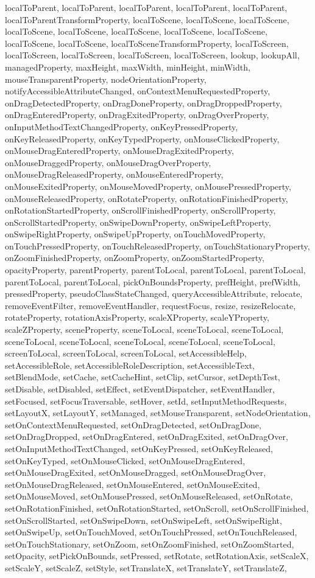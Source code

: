 {{{{{{{{{{{{{{{{{{{{{{{{{{{{{{{{{{{{{{{{{{{{{{{{{{{{{{{{{{{{{localToParent, localToParent, localToParent, localToParent, localToParent, localToParentTransformProperty, localToScene, localToScene, localToScene, localToScene, localToScene, localToScene, localToScene, localToScene, localToScene, localToScene, localToSceneTransformProperty, localToScreen, localToScreen, localToScreen, localToScreen, localToScreen, lookup, lookupAll, managedProperty, maxHeight, maxWidth, minHeight, minWidth, mouseTransparentProperty, nodeOrientationProperty, notifyAccessibleAttributeChanged, onContextMenuRequestedProperty, onDragDetectedProperty, onDragDoneProperty, onDragDroppedProperty, onDragEnteredProperty, onDragExitedProperty, onDragOverProperty, onInputMethodTextChangedProperty, onKeyPressedProperty, onKeyReleasedProperty, onKeyTypedProperty, onMouseClickedProperty, onMouseDragEnteredProperty, onMouseDragExitedProperty, onMouseDraggedProperty, onMouseDragOverProperty, onMouseDragReleasedProperty, onMouseEnteredProperty, onMouseExitedProperty, onMouseMovedProperty, onMousePressedProperty, onMouseReleasedProperty, onRotateProperty, onRotationFinishedProperty, onRotationStartedProperty, onScrollFinishedProperty, onScrollProperty, onScrollStartedProperty, onSwipeDownProperty, onSwipeLeftProperty, onSwipeRightProperty, onSwipeUpProperty, onTouchMovedProperty, onTouchPressedProperty, onTouchReleasedProperty, onTouchStationaryProperty, onZoomFinishedProperty, onZoomProperty, onZoomStartedProperty, opacityProperty, parentProperty, parentToLocal, parentToLocal, parentToLocal, parentToLocal, parentToLocal, pickOnBoundsProperty, prefHeight, prefWidth, pressedProperty, pseudoClassStateChanged, queryAccessibleAttribute, relocate, removeEventFilter, removeEventHandler, requestFocus, resize, resizeRelocate, rotateProperty, rotationAxisProperty, scaleXProperty, scaleYProperty, scaleZProperty, sceneProperty, sceneToLocal, sceneToLocal, sceneToLocal, sceneToLocal, sceneToLocal, sceneToLocal, sceneToLocal, sceneToLocal, screenToLocal, screenToLocal, screenToLocal, setAccessibleHelp, setAccessibleRole, setAccessibleRoleDescription, setAccessibleText, setBlendMode, setCache, setCacheHint, setClip, setCursor, setDepthTest, setDisable, setDisabled, setEffect, setEventDispatcher, setEventHandler, setFocused, setFocusTraversable, setHover, setId, setInputMethodRequests, setLayoutX, setLayoutY, setManaged, setMouseTransparent, setNodeOrientation, setOnContextMenuRequested, setOnDragDetected, setOnDragDone, setOnDragDropped, setOnDragEntered, setOnDragExited, setOnDragOver, setOnInputMethodTextChanged, setOnKeyPressed, setOnKeyReleased, setOnKeyTyped, setOnMouseClicked, setOnMouseDragEntered, setOnMouseDragExited, setOnMouseDragged, setOnMouseDragOver, setOnMouseDragReleased, setOnMouseEntered, setOnMouseExited, setOnMouseMoved, setOnMousePressed, setOnMouseReleased, setOnRotate, setOnRotationFinished, setOnRotationStarted, setOnScroll, setOnScrollFinished, setOnScrollStarted, setOnSwipeDown, setOnSwipeLeft, setOnSwipeRight, setOnSwipeUp, setOnTouchMoved, setOnTouchPressed, setOnTouchReleased, setOnTouchStationary, setOnZoom, setOnZoomFinished, setOnZoomStarted, setOpacity, setPickOnBounds, setPressed, setRotate, setRotationAxis, setScaleX, setScaleY, setScaleZ, setStyle, setTranslateX, setTranslateY, setTranslateZ, }}}}}}}}}}}}}}}}}}}}}}}}}}}}}}}}}}}}}}}}}}}}}}}}}}}}}}}}}}}}}
